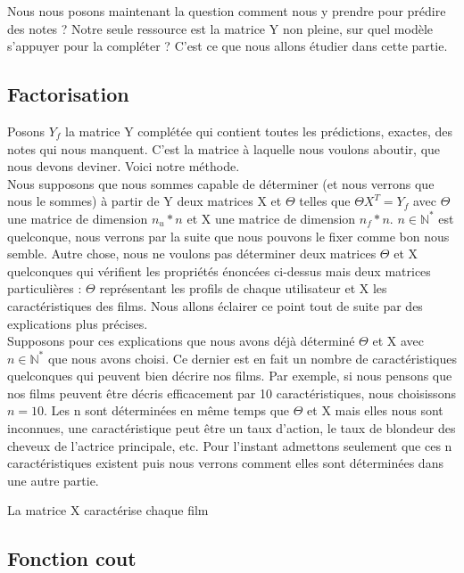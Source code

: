 \documentclass[a4paper,10pt]{article}
\begin{document}
Nous nous posons maintenant la question comment nous y prendre pour prédire des notes ?
Notre seule ressource est la matrice Y non pleine, sur quel modèle s'appuyer pour la compléter ?
C'est ce que nous allons étudier dans cette partie.

\subsection{Factorisation}

Posons $Y_f$ la matrice Y complétée qui contient toutes les prédictions, exactes, des notes qui nous manquent. C'est la matrice à laquelle nous voulons aboutir, que nous devons deviner. Voici notre méthode.\\

Nous supposons que nous sommes capable de déterminer (et nous verrons que nous le sommes) à partir de Y deux matrices X et $\Theta$ telles que $\Theta X^T = Y_f$ avec $\Theta$ une matrice de dimension $n_u * n$ et X une matrice de dimension $n_f * n$. $n \in \mathbb{N}^*$ est quelconque, nous verrons par la suite que nous pouvons le fixer comme bon nous semble.
Autre chose, nous ne voulons pas déterminer deux matrices $\Theta$ et X quelconques qui vérifient les propriétés énoncées ci-dessus mais deux matrices particulières : $\Theta$ représentant les profils de chaque utilisateur et X les caractéristiques des films. Nous allons éclairer ce point tout de suite par des explications plus précises.\\

Supposons pour ces explications que nous avons déjà déterminé $\Theta$ et X avec $n \in \mathbb{N}^*$ que nous avons choisi. Ce dernier est en fait un nombre de caractéristiques quelconques qui peuvent bien décrire nos films. Par exemple, si nous pensons que nos films peuvent être décris efficacement par 10 caractéristiques, nous choisissons $n = 10$.
Les n sont déterminées en même temps que $\Theta$ et X mais elles nous sont inconnues, une caractéristique peut être un taux d'action, le taux de blondeur des cheveux de l'actrice principale, etc. Pour l'instant admettons seulement que ces n caractéristiques existent puis nous verrons comment elles sont déterminées dans une autre partie.

La matrice X caractérise chaque film




\subsection{Fonction cout}
\end{document}
